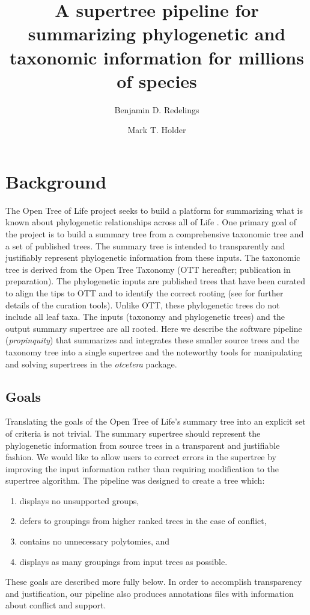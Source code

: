 \documentclass[fleqn,12pt,lineno,english]{wlpeerj}
\title{A supertree pipeline for summarizing phylogenetic and taxonomic information
for millions of species}
\author[1,2]{Benjamin D. Redelings}
\author[2,3,4]{Mark T. Holder}
\affil[1]{Department of Biology, Duke University, Durham NC, US}
\affil[2]{Department of Ecology and Evolutionary Biology, University of Kansas, Lawrence KS, US}
\affil[3]{Biodiversity Institute, University of Kansas, Lawrence KS, US}
\affil[4]{Heidelberg Institute for Theoretical Studies, Heidelberg, Germany}
\begin{document}
\flushbottom
\maketitle
\thispagestyle{empty}

\section{Background}

The Open Tree of Life project seeks to build a platform for summarizing
what is known about phylogenetic relationships across all of Life
\citep{HinchliffEtAl2015}. One primary goal of the project is to
build a summary tree from a comprehensive taxonomic tree and a set
of published trees. The summary tree is intended to transparently
and justifiably represent phylogenetic information from these inputs.
The taxonomic tree is derived from the Open Tree Taxonomy (OTT hereafter;
publication in preparation). The phylogenetic inputs are published
trees that have been curated to align the tips to OTT and to identify
the correct rooting (see \citealt{McTavishEtAt2015} for further details
of the curation tools). Unlike OTT, these phylogenetic trees do not
include all leaf taxa. The inputs (taxonomy and phylogenetic trees)
and the output summary supertree are all rooted. Here we describe
the software pipeline (\emph{propinquity}) that summarizes and integrates
these smaller source trees and the taxonomy tree into a single supertree
and the noteworthy tools for manipulating and solving supertrees in
the \emph{otcetera} package.

\subsection{Goals}

Translating the goals of the Open Tree of Life's summary tree into
an explicit set of criteria is not trivial. The summary supertree
should represent the phylogenetic information from source trees in
a transparent and justifiable fashion. We would like to allow users
to correct errors in the supertree by improving the input information
rather than requiring modification to the supertree algorithm. The
pipeline was designed to create a tree which:
\begin{enumerate}
\item displays no unsupported groups,
\item defers to groupings from higher ranked trees in the case of conflict, 
\item contains no unnecessary polytomies, and
\item displays as many groupings from input trees as possible.
\end{enumerate}
These goals are described more fully below. In order to accomplish
transparency and justification, our pipeline also produces annotations
files with information about conflict and support.
\end{document}
